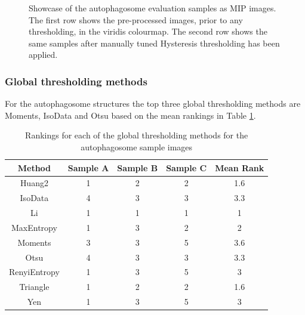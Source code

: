 \begin{figure}[ht!]
	\caption[Showcase of the autophagosome evaluation samples as MIP images.]{Showcase of the autophagosome evaluation samples as MIP images. The first row shows the pre-processed images, prior to any thresholding, in the viridis colourmap. The second row shows the same samples after manually tuned Hysteresis thresholding has been applied.}
	\label{fig:autophagosome_raw}
\end{figure}

\FloatBarrier
\subsubsection{Global thresholding methods}
For the autophagosome structures the top three global thresholding methods are Moments, IsoData and Otsu based on the mean rankings in Table \ref{tab:auto_global_ranks}.
\begin{table}[hb!]
	\centering
	\begin{tabular}{|c|c|c|c|c|}
		\hline
		\textbf{Method} & \textbf{Sample A} & \textbf{Sample B} & \textbf{Sample C} & \textbf{Mean Rank} \\
		\hline
		Huang2 & 1 & 2 & 2 & 1.6 \\
		\hline
		IsoData & 4 & 3 & 3 & 3.3 \\
		\hline
		Li & 1 & 1 & 1 & 1 \\
		\hline
		MaxEntropy & 1 & 3 & 2 & 2 \\
		\hline
		Moments & 3 & 3 & 5 & 3.6 \\
		\hline
		Otsu & 4 & 3 & 3 & 3.3 \\
		\hline
		RenyiEntropy & 1 & 3 & 5 & 3 \\
		\hline
		Triangle & 1 & 2 & 2 & 1.6 \\
		\hline
		Yen & 1 & 3 & 5 & 3 \\
		\hline
	\end{tabular}
	\caption{Rankings for each of the global thresholding methods for the autophagosome sample images}
	\label{tab:auto_global_ranks}
\end{table}

